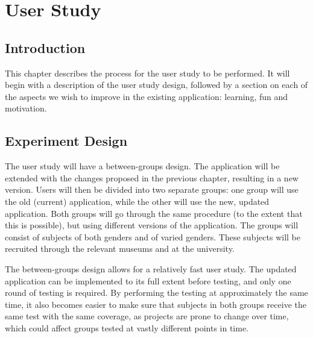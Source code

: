 
\chapter{User Study}

\label{Chapter4}



\section{Introduction}

This chapter describes the process for the user study to be performed. It will begin with a description of the user study design, followed by a section on each of the aspects we wish to improve in the existing application: learning, fun and motivation.


\section{Experiment Design}

The user study will have a between-groups design. The application will be extended with the changes proposed in the previous chapter, resulting in a new version. Users will then be divided into two separate groups: one group will use the old (current) application, while the other will use the new, updated application. Both groups will go through the same procedure (to the extent that this is possible), but using different versions of the application. The groups will consist of subjects of both genders and of varied genders. These subjects will be recruited through the relevant museums and at the university.

The between-groups design allows for a relatively fast user study. The updated application can be implemented to its full extent before testing, and only one round of testing is required. By performing the testing at approximately the same time, it also becomes easier to make sure that subjects in both groups receive the same test with the same coverage, as projects are prone to change over time, which could affect groups tested at vastly different points in time.

